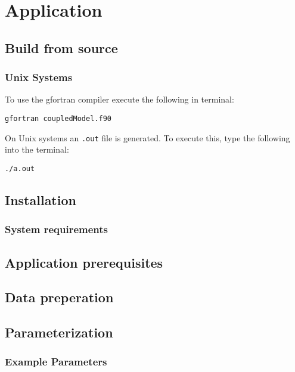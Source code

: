 \section{Application }

\subsection{Build from source}

\subsubsection{Unix Systems}


To use the gfortran compiler execute the following in terminal:

\texttt{gfortran coupledModel.f90}

On Unix systems an \texttt{.out} file is generated. To execute this, type the following into the terminal:

\texttt{./a.out}


\subsection{Installation}


\subsubsection{System requirements}


\subsection{Application prerequisites}


\subsection{Data preperation}


\subsection{Parameterization}

\subsubsection{Example Parameters}


